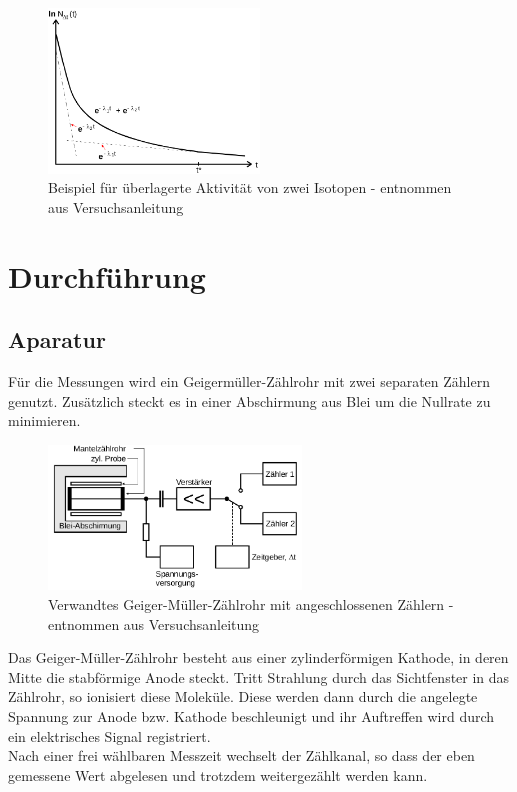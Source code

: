 \begin{figure}[h]
	\includegraphics[width=0.5\textwidth]{pics/zerfall.png}
	\caption{Beispiel für überlagerte Aktivität von zwei Isotopen - entnommen aus Versuchsanleitung}
\end{figure}

	\section{Durchführung}
	\subsection{Aparatur}
Für die Messungen wird ein Geigermüller-Zählrohr mit zwei separaten Zählern genutzt. Zusätzlich steckt es in einer Abschirmung aus Blei um die Nullrate zu minimieren.

\begin{figure}[h]
	\includegraphics[width=0.6\textwidth]{pics/geiger.png}
	\caption{Verwandtes Geiger-Müller-Zählrohr mit angeschlossenen Zählern - entnommen aus Versuchsanleitung}
\end{figure}
Das Geiger-Müller-Zählrohr besteht aus einer zylinderförmigen Kathode, in deren Mitte die stabförmige Anode steckt. Tritt Strahlung durch das Sichtfenster in das Zählrohr, so ionisiert diese Moleküle. Diese werden dann durch die angelegte Spannung zur Anode bzw. Kathode beschleunigt und ihr Auftreffen wird durch ein elektrisches Signal registriert.\\
Nach einer frei wählbaren Messzeit wechselt der Zählkanal, so dass der eben gemessene Wert abgelesen und trotzdem weitergezählt werden kann.

